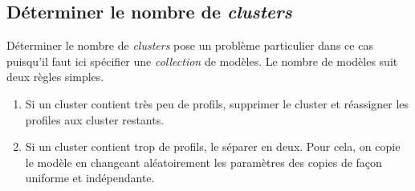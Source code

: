 \documentclass[a4paper, 11pt]{article}
\begin{document}
\subsection{Déterminer le nombre de \textit{clusters}}
Déterminer le nombre de \textit{clusters} pose un problème particulier dans ce cas puisqu'il faut ici spécifier une \textit{collection} de modèles. Le nombre de modèles suit deux règles simples.
\begin{enumerate}
	\item Si un cluster contient très peu de profils, supprimer le cluster et réassigner les profiles aux cluster restants. 
	\item Si un cluster contient trop de profils, le séparer en deux. Pour cela, on copie le modèle en changeant aléatoirement les paramètres des copies de façon uniforme et indépendante. 
\end{enumerate}
\end{document}
